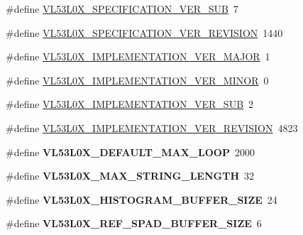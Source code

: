 \begin{DoxyCompactItemize}
\item 
\#define \hyperlink{group__VL53L0X__globaldefine__group_gaf6386b67c7b174b39ffb68c97e371a4f}{V\+L53\+L0\+X\+\_\+\+S\+P\+E\+C\+I\+F\+I\+C\+A\+T\+I\+O\+N\+\_\+\+V\+E\+R\+\_\+\+S\+UB}~7
\item 
\#define \hyperlink{group__VL53L0X__globaldefine__group_gaf8da4c7bb6e36844ffac32e0dc02f929}{V\+L53\+L0\+X\+\_\+\+S\+P\+E\+C\+I\+F\+I\+C\+A\+T\+I\+O\+N\+\_\+\+V\+E\+R\+\_\+\+R\+E\+V\+I\+S\+I\+ON}~1440
\item 
\#define \hyperlink{group__VL53L0X__globaldefine__group_gae98af2f9a5d62382e35dc9cc04db28c1}{V\+L53\+L0\+X\+\_\+\+I\+M\+P\+L\+E\+M\+E\+N\+T\+A\+T\+I\+O\+N\+\_\+\+V\+E\+R\+\_\+\+M\+A\+J\+OR}~1
\item 
\#define \hyperlink{group__VL53L0X__globaldefine__group_ga27193fd4f684caa783696f1dfbdb274c}{V\+L53\+L0\+X\+\_\+\+I\+M\+P\+L\+E\+M\+E\+N\+T\+A\+T\+I\+O\+N\+\_\+\+V\+E\+R\+\_\+\+M\+I\+N\+OR}~0
\item 
\#define \hyperlink{group__VL53L0X__globaldefine__group_gab4609670434b3de664cd2863c2972ee0}{V\+L53\+L0\+X\+\_\+\+I\+M\+P\+L\+E\+M\+E\+N\+T\+A\+T\+I\+O\+N\+\_\+\+V\+E\+R\+\_\+\+S\+UB}~2
\item 
\#define \hyperlink{group__VL53L0X__globaldefine__group_gaefe0941fd2057ce01ace9f01e3b271b0}{V\+L53\+L0\+X\+\_\+\+I\+M\+P\+L\+E\+M\+E\+N\+T\+A\+T\+I\+O\+N\+\_\+\+V\+E\+R\+\_\+\+R\+E\+V\+I\+S\+I\+ON}~4823
\item 
\mbox{\label{group__VL53L0X__globaldefine__group_ga5ea7e1c7019656a4041a4a17071a685a}} 
\#define {\bfseries V\+L53\+L0\+X\+\_\+\+D\+E\+F\+A\+U\+L\+T\+\_\+\+M\+A\+X\+\_\+\+L\+O\+OP}~2000
\item 
\mbox{\label{group__VL53L0X__globaldefine__group_ga8fd4c45e3b62a100529d4805db1892a9}} 
\#define {\bfseries V\+L53\+L0\+X\+\_\+\+M\+A\+X\+\_\+\+S\+T\+R\+I\+N\+G\+\_\+\+L\+E\+N\+G\+TH}~32
\item 
\mbox{\label{group__VL53L0X__globaldefine__group_gac1faec32125735bb990cd71ef0ab2637}} 
\#define {\bfseries V\+L53\+L0\+X\+\_\+\+H\+I\+S\+T\+O\+G\+R\+A\+M\+\_\+\+B\+U\+F\+F\+E\+R\+\_\+\+S\+I\+ZE}~24
\item 
\mbox{\label{group__VL53L0X__globaldefine__group_gae76d61f0f709f353ddc2a811f6abf296}} 
\#define {\bfseries V\+L53\+L0\+X\+\_\+\+R\+E\+F\+\_\+\+S\+P\+A\+D\+\_\+\+B\+U\+F\+F\+E\+R\+\_\+\+S\+I\+ZE}~6
\end{DoxyCompactItemize}


